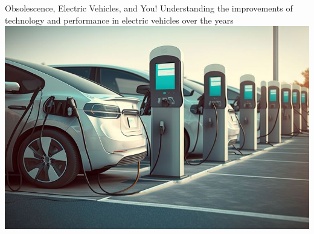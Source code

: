 \documentclass{article}
\begin{document}
{\selectfont
  \huge Obsolescence, Electric Vehicles, and You!
  \newline \newline
  \Large Understanding the improvements of technology and performance in electric vehicles over the years
  \newline \newline
  \includegraphics[scale=0.7]{commercial-ev-charging-station.jpg}

}
\end{document}
